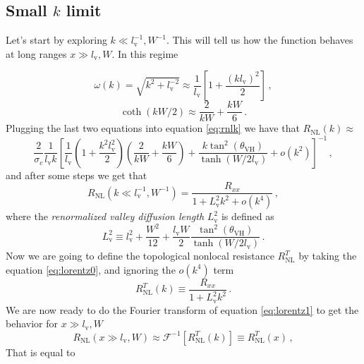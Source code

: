 \subsection{Small $k$ limit}
Let's start by exploring $k\ll l_\textrm{v}^{-1},W^{-1}$. This will tell us how the function behaves at long ranges $x\gg l_\textrm{v},W$. In this regime 

\begin{equation}
    \omega(k)=\sqrt{k^2+l_\textrm{v}^{-2}}\approx \frac 1{l_\textrm{v}}\left[1+\frac{(kl_\textrm{v})^2}2\right]\,,
\end{equation}
\begin{equation}
    \coth (kW/2)\approx \frac 2{kW} + \frac{kW}6\,.
\end{equation}
Plugging the last two equations into equation \ref{eq:rnlk} we have that $R_{\textrm{NL}}(k)\approx$
\begin{equation}
    \frac 2{\sigma_c}\frac 1 {l_\textrm{v}k}\left[
        \frac 1{l_\textrm{v}}\left(1+\frac{k^2l_\textrm{v}^2}{2}\right)\left(\frac 2{kW} + \frac{kW}6\right)+
        \frac{k\tan^2(\theta_{\textrm{VH}})}{\tanh(W/2l_\textrm{v})} + o(k^2)
    \right]^{-1}\,,
\end{equation}
and after some steps we get that
\begin{equation}
    R_{\textrm{NL}}(k\ll l_\textrm{v}^{-1},W^{-1})=
    \frac {R_{xx}}{1+L_\textrm{v}^2k^2 + o(k^4)}
    \label{eq:lorentz0}\,,
\end{equation}
where the \textit{renormalized valley diffusion length} $L_\textrm{v}^2$ is defined as
\begin{equation}
    L_\textrm{v}^2 \equiv l_\textrm{v}^2+\frac {W^2}{12} +\frac{l_\textrm{v}W}2 \frac{\tan^2(\theta_{\textrm{VH}})}{\tanh(W/2l_\textrm{v})}\,.
\end{equation}
Now we are going to define the topological nonlocal resistance $R_{\textrm{NL}}^T$ by taking the equation \ref{eq:lorentz0}, and ignoring the $o(k^4)$ term
\begin{equation}
    R_{\textrm{NL}}^T(k)\equiv
    \frac {R_{xx}}{1+L_\textrm{v}^2k^2}\,.
    \label{eq:lorentz1}
\end{equation} 
We are now ready to do the Fourier transform of equation \ref{eq:lorentz1} to get the behavior for $x\gg l_\textrm{v},W$
\begin{equation}
    R_{\textrm{NL}}(x\gg l_\textrm{v},W)\approx\mathcal F^{-1}\left[R_{\textrm{NL}}^T(k)\right]\equiv R_{\textrm{NL}}^T(x)\,,
\end{equation}
That is equal to 

